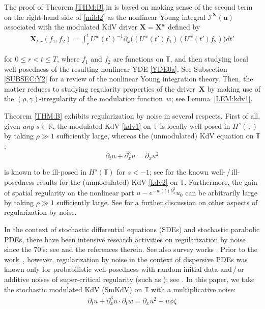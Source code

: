 \documentclass[letterpaper, 11pt,  reqno]{amsart}
\newcommand{\1}{\hspace{0.5mm}\textup{I}\hspace{0.5mm}}
\newcommand{\I}{\mathcal{I}}
\newcommand{\noi}{\noindent}
\newcommand{\R}{\mathbb{R}}
\newcommand{\T}{\mathbb{T}}
\newcommand{\g}{\gamma}
\newcommand{\dx}{\partial_x}
\newcommand{\dt}{\partial_t}
\newcommand{\uw}{U^w}
\newcommand{\uu}{\mathbf{u}}
\newcommand{\XX}{\mathbf{X}}
\numberwithin{equation}{section}
\numberwithin{theorem}{section}
\begin{document}
The proof of Theorem \ref{THM:B} in \cite{CGLLO1} is based on 
making sense of the second term 
on the right-hand side of  \eqref{mild2}
as the nonlinear Young integral 
 $\I^\XX(\uu)$
associated  with 
the 
modulated KdV  driver $\XX = \XX^w$ defined by 
 \begin{align}
\XX_{t,r}(f_1,f_2)
=\int_r^t  \uw(t')^{-1}  \partial_x
\big( (\uw(t')  f_1)( \uw(t') f_2 )\big) dt'
\label{K1x}
\end{align}


\noi
for $0 \le r < t \le T$, where  $f_1$ and $f_2$ are functions on $\T$, 
and then studying local well-posedness
of the resulting 
 nonlinear YDE 
\eqref{YDE0a}.
See Subsection \ref{SUBSEC:Y2}
for a review of the nonlinear Young integration theory.
Then, the matter  reduces
to studying 
 regularity properties of the  driver~$\XX$
by making use of the $(\rho, \g)$-irregularity 
of the modulation function~$w$;
see 
Lemma~\ref{LEM:kdv1}.




\medskip


Theorem \ref{THM:B}
exhibits regularization by noise
in several respects.
First of all, 
given {\it any} $s \in \R$, 
the modulated KdV \eqref{kdv1} on $\T$
is locally well-posed
in $H^s(\T)$
by taking $\rho \gg1$ sufficiently large, 
whereas 
 the (unmodulated) KdV equation on $\T$:
\begin{equation}
\dt u+  \dx^3 u  =\dx u^2
\label{kdv2}
\end{equation}


\noi
is known to be ill-posed in $H^s(\T)$ for $s < -1$;
see
\cite{KPV96, CKSTT03, 
KT1, M12,  KV19}
for the known well-\,/\,ill-posedness
results for the (unmodulated) KdV \eqref{kdv2} on $\T$.
Furthermore, 
the gain of spatial regularity 
on the nonlinear part $ u - e^{-w(t) \dx^3}u_0 $
can be arbitrarily large by taking $\rho \gg1$
sufficiently large.
See \cite{CGLLO1}
for a further discussion on other aspects of regularization by noise.












In the context of stochastic differential equations (SDEs) 
and stochastic parabolic PDEs, 
there  have been intensive research activities
on regularization by noise 
since the 70's;
see 
 \cite{FGP, GG0, G22, RT, CGLLO1} and the  references therein.
See also   survey works \cite{Flan, Gess}.
Prior to the work~\cite{CGLLO1}, 
however, 
regularization by noise 
in the context of 
dispersive PDEs
was known only 
for probabilistic well-posedness with  random initial data and\,/\,or additive noises of super-critical regularity
(such as \cite{BO96, BT08, CO, OP, GKO2, DNY2, DNY3, OOT1, Bring, OOT2, BDNY});
see \cite[Remark~1.8]{CGLLO1}.
In this paper, we 
take 
 the  stochastic modulated
KdV (SmKdV) on $\T$ with a multiplicative noise:
\begin{align}
\dt u+  \dx^3 u \cdot \dt w = \dx u^2 + u \phi \zeta
\label{skdv1}
\end{align}
\end{document}
